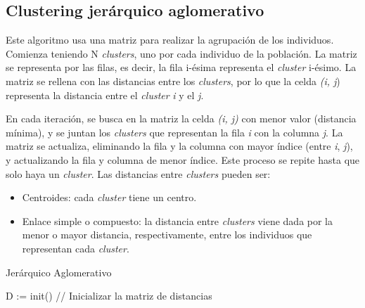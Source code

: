 	\newpage

	\subsection{Clustering jerárquico aglomerativo}

		Este algoritmo usa una matriz para realizar la agrupación de los individuos. Comienza teniendo N \textit{clusters}, uno por cada individuo de la población. La matriz se representa por las filas, es decir, la fila i-ésima representa el \textit{cluster} i-ésimo. La matriz se rellena con las distancias entre los \textit{clusters}, por lo que la celda \textit{(i, j}) representa la distancia entre el \textit{cluster} \textit{i} y el \textit{j}.  
		
		En cada iteración, se busca en la matriz la celda \textit{(i, j)} con menor valor (distancia mínima), y se juntan los \textit{clusters} que representan la fila \textit{i} con la columna \textit{j}. La matriz se actualiza, eliminando la fila y la columna con mayor índice (entre \textit{i}, \textit{j}), y actualizando la fila y columna de menor índice. Este proceso se repite hasta que solo haya un \textit{cluster}. Las distancias entre \textit{clusters} pueden ser:
		\begin{itemize}
		\vspace{-0.25cm}
		\item Centroides: cada \textit{cluster} tiene un centro.
		\vspace{-0.25cm}
		\item Enlace simple o compuesto: la distancia entre \textit{clusters} viene dada por la menor o mayor distancia, respectivamente, entre los individuos que representan cada \textit{cluster}.
		\vspace{-0.30cm}
		\end{itemize}



		\begin{algorithm}[!h]
			\caption{Jerárquico Aglomerativo}
			D := init() // Inicializar la matriz de distancias\\
			
		\end{algorithm}
		\vspace{-0.20cm}

